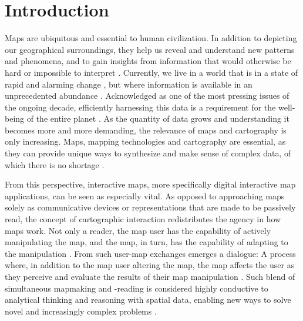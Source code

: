 \section{Introduction}



Maps are ubiquitous and essential to human civilization.
In addition to depicting our geographical surroundings,
they help us reveal and understand new patterns and phenomena,
and to gain insights from information
that would otherwise be hard or impossible to interpret \parencite{mac2004}.
Currently, we live in a world that is in a state of rapid and
alarming change \parencite{un2023},
but where information is available in an unprecedented abundance
\parencite{rob2017a, un2023}.
Acknowledged as one of the most pressing issues of the ongoing decade,
efficiently harnessing this data is a requirement
for the well-being of the entire planet \parencite{un2020}.
As the quantity of data grows
and understanding it becomes more and more demanding,
the relevance of maps and cartography is only increasing.
Maps, mapping technologies and cartography are essential,
as they can provide unique ways to synthesize and make sense of complex data,
of which there is no shortage \parencite{kra2021}.

From this perspective,
interactive maps, more specifically digital interactive map applications,
can be seen as especially vital.
As opposed to approaching maps solely as communicative devices or representations
that are made to be passively read,
the concept of cartographic interaction redistributes the agency in how maps work.
Not only a reader, the map user has the capability of actively manipulating the map,
and the map, in turn, has the capability of adapting to the manipulation \parencite{eds2008}.
From such user-map exchanges emerges a dialogue:
A process where, in addition to the map user altering the map,
the map affects the user as they perceive and evaluate the results of their map manipulation
\parencite{rot2011}.
Such blend of simultaneous mapmaking and -reading
is considered highly conductive to analytical thinking and reasoning
with spatial data,
enabling new ways to solve novel and increasingly complex problems
\parencite{rob2017b, and2010}.


